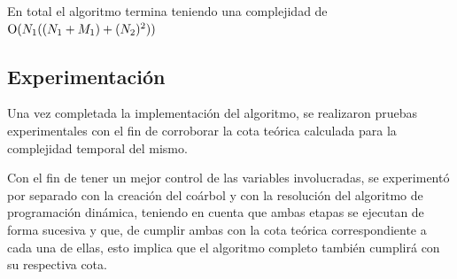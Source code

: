 En total el algoritmo termina teniendo una complejidad de $\operatorname{O}(N_1((N_1 + M_1) + (N_2)^2 ))$

\subsection{Experimentación}
Una vez completada la implementación del algoritmo, se realizaron pruebas
experimentales con el fin de corroborar la cota teórica calculada para la
complejidad temporal del mismo.

Con el fin de tener un mejor control de las variables involucradas, se
experimentó por separado con la creación del coárbol y con la resolución del
algoritmo de programación dinámica, teniendo en cuenta que ambas etapas se
ejecutan de forma sucesiva y que, de cumplir ambas con la cota teórica
correspondiente a cada una de ellas, esto implica que el algoritmo completo
también cumplirá con su respectiva cota.


